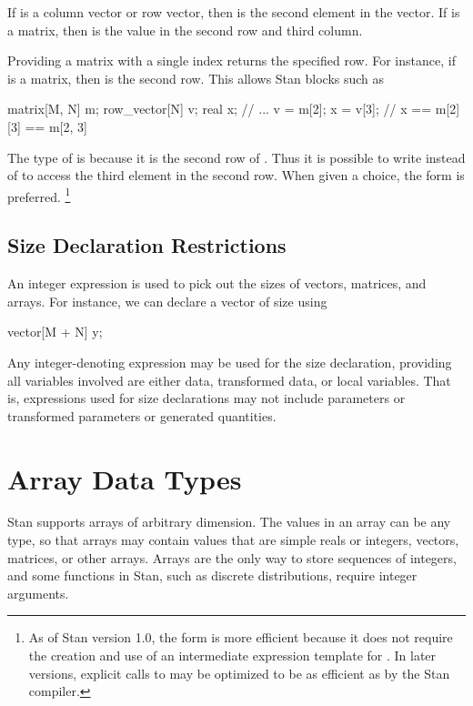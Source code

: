If  is a column vector or row vector, then  is the
second element in the vector.  If  is a matrix, then
 is the value in the second row and third column.

Providing a matrix with a single index returns the specified row.  For
instance, if  is a matrix, then  is the second row.
This allows Stan blocks such as
%
\begin{stancode}
matrix[M, N] m;
row_vector[N] v;
real x;
// ...
v = m[2];
x = v[3];   // x == m[2][3] == m[2, 3]
\end{stancode}
%
The type of  is  because it is the second
row of .  Thus it is possible to write  instead
of  to access the third element in the second row.  When
given a choice, the form  is preferred.%
%
\footnote{As of Stan version 1.0, the form
   is more efficient because it does not require the
  creation and use of an intermediate expression template for
  .  In later versions, explicit calls to 
  may be optimized to be as efficient as  by the Stan
  compiler.\label{array-index-style.footnote}}


\subsection{Size Declaration Restrictions}

An integer expression is used to pick out the sizes of vectors,
matrices, and arrays.  For instance, we can declare a vector of size
 using
%
\begin{stancode}
vector[M + N] y;
\end{stancode}
%
Any integer-denoting expression may be used for the size declaration,
providing all variables involved are either data, transformed data, or
local variables.  That is, expressions used for size declarations may
not include parameters or transformed parameters or generated
quantities.

\section{Array Data Types}\label{array-data-types.section}

Stan supports arrays of arbitrary dimension.  The values in an array
can be any type, so that arrays may contain values that are simple
reals or integers, vectors, matrices, or other arrays.  Arrays are the
only way to store sequences of integers, and some functions in Stan,
such as discrete distributions, require integer arguments.

